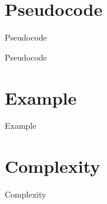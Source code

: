 \documentclass{beamer}
\begin{document}
\section{Pseudocode}

\begin{frame}{Pseudocode}
\begin{center}
    
\end{center}

    
\end{frame}



\begin{frame}{Pseudocode}
    \begin{center}
        
    \end{center}
\end{frame}

\section{Example}



\begin{frame}{Example}
    
    
    
    
    
    
    
\end{frame}


\section{Complexity}


\begin{frame}{Complexity}
    \begin{columns}

        \begin{center}
            
        \end{center}
            

        

        \begin{center}
            
        \end{center}
        

    \end{columns}
\end{frame}
\end{document}
